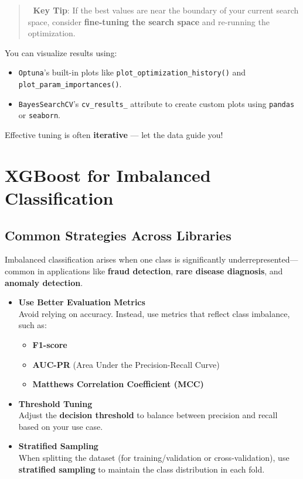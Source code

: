 \documentclass[
  letterpaper,
  DIV=11,
  numbers=noendperiod]{scrreprt}
\providecommand{\tightlist}{%
  \setlength{\itemsep}{0pt}\setlength{\parskip}{0pt}}\usepackage{longtable,booktabs,array}
\begin{document}
\begin{quote}
🔹 \textbf{Key Tip}: If the best values are near the boundary of your
current search space, consider \textbf{fine-tuning the search space} and
re-running the optimization.
\end{quote}

You can visualize results using:

\begin{itemize}
\tightlist
\item
  \texttt{Optuna}'s built-in plots like
  \texttt{plot\_optimization\_history()} and
  \texttt{plot\_param\_importances()}.
\item
  \texttt{BayesSearchCV}'s \texttt{cv\_results\_} attribute to create
  custom plots using \texttt{pandas} or \texttt{seaborn}.
\end{itemize}

Effective tuning is often \textbf{iterative} --- let the data guide you!

\section{XGBoost for Imbalanced
Classification}\label{xgboost-for-imbalanced-classification}

\subsection{Common Strategies Across
Libraries}\label{common-strategies-across-libraries}

Imbalanced classification arises when one class is significantly
underrepresented---common in applications like \textbf{fraud detection},
\textbf{rare disease diagnosis}, and \textbf{anomaly detection}.

\begin{itemize}
\item
  \textbf{Use Better Evaluation Metrics}\\
  Avoid relying on accuracy. Instead, use metrics that reflect class
  imbalance, such as:

  \begin{itemize}
  \tightlist
  \item
    \textbf{F1-score}
  \item
    \textbf{AUC-PR} (Area Under the Precision-Recall Curve)
  \item
    \textbf{Matthews Correlation Coefficient (MCC)}
  \end{itemize}
\item
  \textbf{Threshold Tuning}\\
  Adjust the \textbf{decision threshold} to balance between precision
  and recall based on your use case.
\item
  \textbf{Stratified Sampling}\\
  When splitting the dataset (for training/validation or
  cross-validation), use \textbf{stratified sampling} to maintain the
  class distribution in each fold.
\end{itemize}
\end{document}
